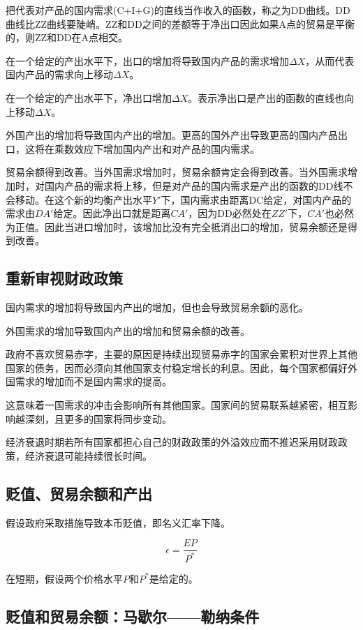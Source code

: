 \documentclass{article}
\begin{document}
把代表对产品的国内需求(C+I+G)的直线当作收入的函数，称之为DD曲线。DD曲线比ZZ曲线要陡峭。ZZ和DD之间的差额等于净出口因此如果A点的贸易是平衡的，则ZZ和DD在A点相交。

在一个给定的产出水平下，出口的增加将导致国内产品的需求增加$ \Delta X $，从而代表国内产品的需求向上移动$ \Delta X $。

在一个给定的产出水平下，净出口增加$ \Delta X $。表示净出口是产出的函数的直线也向上移动$ \Delta X $。

外国产出的增加将导致国内产出的增加。更高的国外产出导致更高的国内产品出口，这将在乘数效应下增加国内产出和对产品的国内需求。

贸易余额得到改善。当外国需求增加时，贸易余额肯定会得到改善。当外国需求增加时，对国内产品的需求将上移，但是对产品的国内需求是产出的函数的DD线不会移动。在这个新的均衡产出水平$ Y' $下，国内需求由距离DC给定，对国内产品的需求由$ DA' $给定。因此净出口就是距离$ CA' $，因为DD必然处在$ ZZ' $下，$ CA' $也必然为正值。因此当进口增加时，该增加比没有完全抵消出口的增加，贸易余额还是得到改善。

\subsection{重新审视财政政策}

国内需求的增加将导致国内产出的增加，但也会导致贸易余额的恶化。

外国需求的增加导致国内产出的增加和贸易余额的改善。

政府不喜欢贸易赤字，主要的原因是持续出现贸易赤字的国家会累积对世界上其他国家的债务，因而必须向其他国家支付稳定增长的利息。因此，每个国家都偏好外国需求的增加而不是国内需求的提高。

这意味着一国需求的冲击会影响所有其他国家。国家间的贸易联系越紧密，相互影响越深刻，且更多的国家将同步变动。

经济衰退时期若所有国家都担心自己的财政政策的外溢效应而不推迟采用财政政策，经济衰退可能持续很长时间。

\subsection{贬值、贸易余额和产出}

假设政府采取措施导致本币贬值，即名义汇率下降。

\[
\epsilon=\frac{EP}{P^*}
\]

在短期，假设两个价格水平$ P $和$ P^* $是给定的。

\subsection{贬值和贸易余额：马歇尔——勒纳条件}
\end{document}
